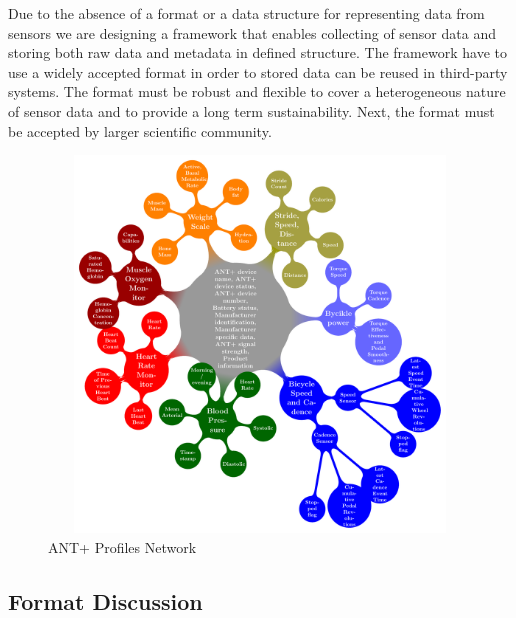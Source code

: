 \documentclass[conference]{IEEEconf}
\begin{document}
Due to the absence of a format or a data structure for representing data from sensors we are designing a framework that enables collecting of sensor data and storing both raw data and metadata in defined structure. The framework have to use a widely accepted format in order to stored data can be reused in third-party systems. The format must be robust and flexible to cover a heterogeneous nature of sensor data and to provide a long term sustainability. Next, the format must be accepted by larger scientific community. 

\begin{figure}
\centering\includegraphics[width=12cm, height=10cm]{AntPlusProfiles}
\caption{\label{AntPlus}ANT+ Profiles Network}
\end{figure}

\subsection{Format Discussion}
\end{document}
